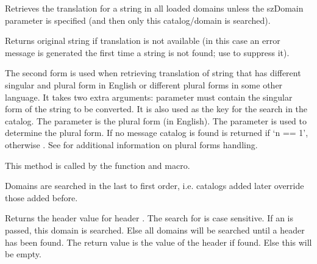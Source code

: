 

Retrieves the translation for a string in all loaded domains unless the szDomain
parameter is specified (and then only this catalog/domain is searched).

Returns original string if translation is not available
(in this case an error message is generated the first time
a string is not found; use  to suppress it).

The second form is used when retrieving translation of string that has
different singular and plural form in English or different plural forms in some
other language. It takes two extra arguments: 
parameter must contain the singular form of the string to be converted.
It is also used as the key for the search in the catalog.
The  parameter is the plural form (in English).
The parameter  is used to determine the plural form.  If no
message catalog is found  is returned if `n == 1',
otherwise .
See  for additional information on plural forms handling.

This method is called by the 
function and  macro.


Domains are searched in the last to first order, i.e. catalogs
added later override those added before.


\label{wxlocalegetheadervalue}


Returns the header value for header . The search for  is case sensitive. If an 
is passed, this domain is searched. Else all domains will be searched until a header has been found.
The return value is the value of the header if found. Else this will be empty.

\label{wxlocalegetsysname}

